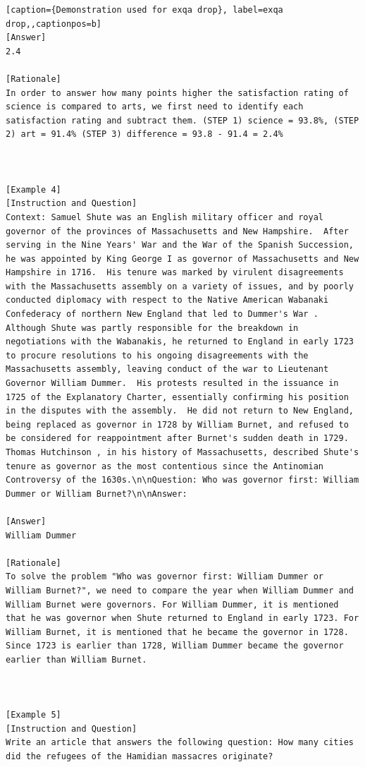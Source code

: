 \begin{lstlisting}[caption={Demonstration used for exqa drop}, label=exqa drop,,captionpos=b]
[Answer] 
2.4

[Rationale]
In order to answer how many points higher the satisfaction rating of science is compared to arts, we first need to identify each satisfaction rating and subtract them. (STEP 1) science = 93.8%, (STEP 2) art = 91.4% (STEP 3) difference = 93.8 - 91.4 = 2.4%



[Example 4]
[Instruction and Question] 
Context: Samuel Shute was an English military officer and royal governor of the provinces of Massachusetts and New Hampshire.  After serving in the Nine Years' War and the War of the Spanish Succession, he was appointed by King George I as governor of Massachusetts and New Hampshire in 1716.  His tenure was marked by virulent disagreements with the Massachusetts assembly on a variety of issues, and by poorly conducted diplomacy with respect to the Native American Wabanaki Confederacy of northern New England that led to Dummer's War . Although Shute was partly responsible for the breakdown in negotiations with the Wabanakis, he returned to England in early 1723 to procure resolutions to his ongoing disagreements with the Massachusetts assembly, leaving conduct of the war to Lieutenant Governor William Dummer.  His protests resulted in the issuance in 1725 of the Explanatory Charter, essentially confirming his position in the disputes with the assembly.  He did not return to New England, being replaced as governor in 1728 by William Burnet, and refused to be considered for reappointment after Burnet's sudden death in 1729. Thomas Hutchinson , in his history of Massachusetts, described Shute's tenure as governor as the most contentious since the Antinomian Controversy of the 1630s.\n\nQuestion: Who was governor first: William Dummer or William Burnet?\n\nAnswer:

[Answer] 
William Dummer

[Rationale]
To solve the problem "Who was governor first: William Dummer or William Burnet?", we need to compare the year when William Dummer and William Burnet were governors. For William Dummer, it is mentioned that he was governor when Shute returned to England in early 1723. For William Burnet, it is mentioned that he became the governor in 1728. Since 1723 is earlier than 1728, William Dummer became the governor earlier than William Burnet.



[Example 5]
[Instruction and Question]
Write an article that answers the following question: How many cities did the refugees of the Hamidian massacres originate?


\end{lstlisting}
